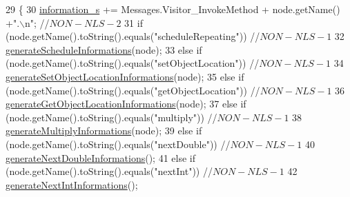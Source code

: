 \begin{DoxyCode}
29                                                 \{
30         \hyperlink{classit_1_1isislab_1_1masonassisteddocumentation_1_1visitor_1_1_code_visitor_a628ab846d2f4de647f171060ebe73774}{information\_s} += Messages.Visitor\_InvokeMethod + node.getName() +\textcolor{stringliteral}{".\(\backslash\)n"}; \textcolor{comment}{//$NON-NLS-2$}
31         \textcolor{keywordflow}{if} (node.getName().toString().equals(\textcolor{stringliteral}{"scheduleRepeating"})) \textcolor{comment}{//$NON-NLS-1$}
32             \hyperlink{classit_1_1isislab_1_1masonassisteddocumentation_1_1visitor_1_1_start_step_method_visitor_a70d875f061a61b2a52bc3c3715d5a2c7}{generateScheduleInformations}(node); 
33         \textcolor{keywordflow}{else} \textcolor{keywordflow}{if} (node.getName().toString().equals(\textcolor{stringliteral}{"setObjectLocation"})) \textcolor{comment}{//$NON-NLS-1$}
34             \hyperlink{classit_1_1isislab_1_1masonassisteddocumentation_1_1visitor_1_1_start_step_method_visitor_a737cae4933895eb73a56e06059cb3edf}{generateSetObjectLocationInformations}(node);
35         \textcolor{keywordflow}{else} \textcolor{keywordflow}{if} (node.getName().toString().equals(\textcolor{stringliteral}{"getObjectLocation"})) \textcolor{comment}{//$NON-NLS-1$}
36             \hyperlink{classit_1_1isislab_1_1masonassisteddocumentation_1_1visitor_1_1_start_step_method_visitor_a4914dd419805eb665b631822bfd74c85}{generateGetObjectLocationInformations}(node);
37         \textcolor{keywordflow}{else} \textcolor{keywordflow}{if} (node.getName().toString().equals(\textcolor{stringliteral}{"multiply"})) \textcolor{comment}{//$NON-NLS-1$}
38             \hyperlink{classit_1_1isislab_1_1masonassisteddocumentation_1_1visitor_1_1_start_step_method_visitor_a2b59b62458896c8b66cc651ac352bc68}{generateMultiplyInformations}(node);
39         \textcolor{keywordflow}{else} \textcolor{keywordflow}{if} (node.getName().toString().equals(\textcolor{stringliteral}{"nextDouble"})) \textcolor{comment}{//$NON-NLS-1$}
40             \hyperlink{classit_1_1isislab_1_1masonassisteddocumentation_1_1visitor_1_1_start_step_method_visitor_af5504e5226da24e3d40ff088853ffef4}{generateNextDoubleInformations}();
41         \textcolor{keywordflow}{else} \textcolor{keywordflow}{if} (node.getName().toString().equals(\textcolor{stringliteral}{"nextInt"})) \textcolor{comment}{//$NON-NLS-1$}
42             \hyperlink{classit_1_1isislab_1_1masonassisteddocumentation_1_1visitor_1_1_start_step_method_visitor_ad9ba6e7095c02728b1d4f38c0927be16}{generateNextIntInformations}();

\end{DoxyCode}
